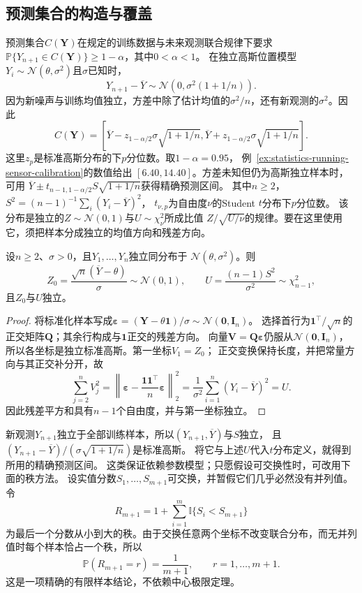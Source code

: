 \subsection{预测集合的构造与覆盖}
\label{sec:probability-exchangeability-conformal-ranks}
\label{sec:rv-prediction-sets}
预测集合\(C(\bm Y)\)在规定的训练数据与未来观测联合规律下要求
\(\mathbb P\{Y_{n+1}\in C(\bm Y)\}\geq1-\alpha\)，其中\(0<\alpha<1\)。
在独立高斯位置模型\(Y_i\sim\mathcal N(\theta,\sigma^2)\)且\(\sigma\)已知时，
\[
Y_{n+1}-\overline Y\sim\mathcal N(0,\sigma^2(1+1/n)).
\]
因为新噪声与训练均值独立，方差中除了估计均值的\(\sigma^2/n\)，还有新观测的\(\sigma^2\)。因此
\[
C(\bm Y)=\left[\overline Y-z_{1-\alpha/2}\sigma\sqrt{1+1/n},
\overline Y+z_{1-\alpha/2}\sigma\sqrt{1+1/n}\right].
\]
这里\(z_p\)是标准高斯分布的下\(p\)分位数。取\(1-\alpha=0.95\)，
例~\ref{ex:statistics-running-sensor-calibration}的数值给出
\([6.40,14.40]\)。方差未知但仍为高斯独立样本时，可用
\(\overline Y\pm t_{n-1,1-\alpha/2}S\sqrt{1+1/n}\)获得精确预测区间。
其中\(n\geq2\)，\(S^2=(n-1)^{-1}\sum_i(Y_i-\overline Y)^2\)，
\(t_{\nu,p}\)为自由度\(\nu\)的Student \(t\)分布下\(p\)分位数。
该分布是独立的\(Z\sim\mathcal N(0,1)\)与\(U\sim\chi_\nu^2\)所成比值
\(Z/\sqrt{U/\nu}\)的规律。要在这里使用它，须把样本分成独立的均值方向和残差方向。

\begin{lemma}[高斯样本的均值与残差分解]
\label{lem:statistics-gaussian-mean-residual}
设\(n\geq2\)、\(\sigma>0\)，且\(Y_1,\ldots,Y_n\)独立同分布于
\(\mathcal N(\theta,\sigma^2)\)。则
\[
 Z_0=\frac{\sqrt n(\overline Y-\theta)}{\sigma}\sim\mathcal N(0,1),
 \qquad U=\frac{(n-1)S^2}{\sigma^2}\sim\chi^2_{n-1},
\]
且\(Z_0\)与\(U\)独立。
\end{lemma}
\begin{proof}
将标准化样本写成\(\bm\varepsilon=(\bm Y-\theta\bm1)/\sigma\sim\mathcal N(\bm0,\bm I_n)\)。
选择首行为\(\bm1^\top/\sqrt n\)的正交矩阵\(\bm Q\)；其余行构成与\(\bm1\)正交的残差方向。
向量\(\bm V=\bm Q\bm\varepsilon\)仍服从\(\mathcal N(\bm0,\bm I_n)\)，
所以各坐标是独立标准高斯。第一坐标\(V_1=Z_0\)；
正交变换保持长度，并把常量方向与其正交补分开，故
\[
 \sum_{j=2}^nV_j^2
 =\left\|\bm\varepsilon-\frac{\bm1\bm1^\top}{n}\bm\varepsilon\right\|_2^2
 =\frac1{\sigma^2}\sum_{i=1}^n(Y_i-\overline Y)^2=U.
\]
因此残差平方和具有\(n-1\)个自由度，并与第一坐标独立。
\end{proof}
新观测\(Y_{n+1}\)独立于全部训练样本，所以\((Y_{n+1},\overline Y)\)与\(S\)独立，
且\((Y_{n+1}-\overline Y)/(\sigma\sqrt{1+1/n})\)是标准高斯。
将它与上述\(U\)代入\(t\)分布定义，就得到所用的精确预测区间。
这类保证依赖参数模型；只愿假设可交换性时，可改用下面的秩方法。
设实值分数\(S_1,\ldots,S_{m+1}\)可交换，并暂假它们几乎必然没有并列值。令
\[ R_{m+1}
  =1+\sum_{i=1}^{m}\mathbb{I}\{S_i<S_{m+1}\} \]
为最后一个分数从小到大的秩。由于交换任意两个坐标不改变联合分布，而无并列值时每个样本恰占一个秩，所以
\begin{equation}
  \mathbb{P}(R_{m+1}=r)=\frac{1}{m+1},
  \qquad r=1,\ldots,m+1.
  \label{eq:probability-uniform-rank}
\end{equation}
这是一项精确的有限样本结论，不依赖中心极限定理。

